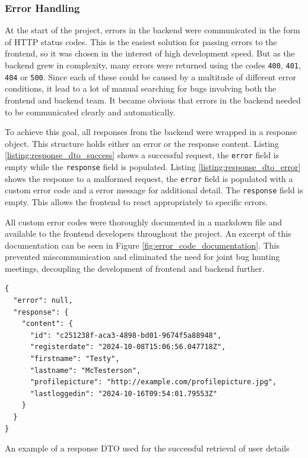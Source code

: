 \newpage{}

\subsubsection{Error Handling}

At the start of the project, errors in the backend were communicated in the form
of HTTP status codes. This is the easiest solution for passing errors to the
frontend, so it was chosen in the interest of high development speed. But as the
backend grew in complexity, many errors were returned using the codes
\texttt{400}, \texttt{401}, \texttt{404} or \texttt{500}. Since each of these
could be caused by a multitude of different error conditions, it lead to a lot
of manual searching for bugs involving both the frontend and backend team. It
became obvious that errors in the backend needed to be communicated clearly and
automatically.

To achieve this goal, all responses from the backend were wrapped in a response
object. This structure holds either an error or the response content. Listing
\ref{listing:response_dto_success} shows a successful request, the
\texttt{error} field is empty while the \texttt{response} field is populated.
Listing \ref{listing:response_dto_error} shows the response to a malformed
request, the \texttt{error} field is populated with a custom error code and a
error message for additional detail. The \texttt{response} field is empty. This
allows the frontend to react appropriately to specific errors.

All custom error codes were thoroughly documented in a markdown file and
available to the frontend developers throughout the project. An excerpt of this
documentation can be seen in Figure \ref{fig:error_code_documentation}. This
prevented miscommunication and eliminated the need for joint bug hunting
meetings, decoupling the development of frontend and backend further.



\begin{listing}[htbp]
  \centering{}
  \begin{minipage}{0.825\textwidth}
  \begin{verbatim}
{
  "error": null,
  "response": {
    "content": {
      "id": "c251238f-aca3-4898-bd01-9674f5a88948",
      "registerdate": "2024-10-08T15:06:56.047718Z",
      "firstname": "Testy",
      "lastname": "McTesterson",
      "profilepicture": "http://example.com/profilepicture.jpg",
      "lastloggedin": "2024-10-16T09:54:01.79553Z"
    }
  }
}
  \end{verbatim}
  \end{minipage}
  \caption{An example of a response DTO used for the successful retrieval of user details}
  \label{listing:response_dto_success}
\end{listing}

